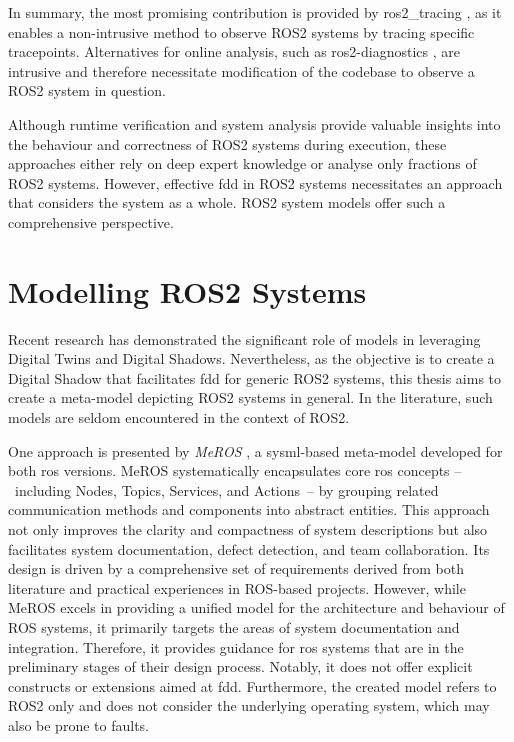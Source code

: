 In summary, the most promising contribution is provided by ros2\_tracing \cite{ros2_tracing}, as it enables a non-intrusive method to observe ROS2 systems by tracing specific tracepoints. Alternatives for online analysis, such as ros2-diagnostics \cite{github:ros_diagnostics}, are intrusive and therefore necessitate modification of the codebase to observe a ROS2 system in question.

Although runtime verification and system analysis provide valuable insights into the behaviour and correctness of ROS2 systems during execution, these approaches either rely on deep expert knowledge or analyse only fractions of ROS2 systems. However, effective \acl{fdd} in ROS2 systems necessitates an approach that considers the system as a whole. ROS2 system models offer such a comprehensive perspective.


\section{Modelling ROS2 Systems} \label{sec:modellingROS2}
Recent research has demonstrated the significant role of models in leveraging Digital Twins and Digital Shadows. Nevertheless, as the objective is to create a Digital Shadow that facilitates \acl{fdd} for generic ROS2 systems, this thesis aims to create a meta-model depicting ROS2 systems in general. In the literature, such models are seldom encountered in the context of ROS2.

One approach is presented by \emph{MeROS} \cite{MeROS}, a \ac{sysml}-based meta-model developed for both \ac{ros} versions. MeROS systematically encapsulates core \ac{ros} concepts --~including Nodes, Topics, Services, and Actions~-- by grouping related communication methods and components into abstract entities. This approach not only improves the clarity and compactness of system descriptions but also facilitates system documentation, defect detection, and team collaboration.
Its design is driven by a comprehensive set of requirements derived from both literature and practical experiences in ROS-based projects. However, while MeROS excels in providing a unified model for the architecture and behaviour of ROS systems, it primarily targets the areas of system documentation and integration. Therefore, it provides guidance for \ac{ros} systems that are in the preliminary stages of their design process.
Notably, it does not offer explicit constructs or extensions aimed at \acl{fdd}. Furthermore, the created model refers to ROS2 only and does not consider the underlying operating system, which may also be prone to faults.

